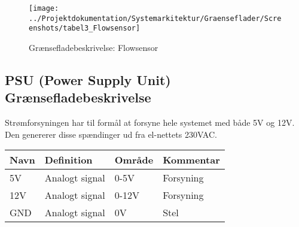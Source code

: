 \begin{figure}[H]
	\centering
	\texttt{[image: ../Projektdokumentation/Systemarkitektur/Graenseflader/Screenshots/tabel3\_Flowsensor]}
	\caption{Grænsefladebeskrivelse: Flowsensor}
	\label{screenshot:tabel3}
\end{figure}

\subsection{PSU (Power Supply Unit) Grænsefladebeskrivelse}
Strømforsyningen har til formål at forsyne hele systemet med både 5V og 12V. Den genererer disse spændinger ud fra el-nettets 230VAC.

\begin{table}[h]
\centering
\begin{tabular}{|l|l|l|l|}
\hline
\textbf{Navn} & \textbf{Definition} & \textbf{Område} & \textbf{Kommentar} \\ \hline
5V            & Analogt signal      & 0-5V            & Forsyning          \\ \hline
12V           & Analogt signal      & 0-12V           & Forsyning          \\ \hline
GND           & Analogt signal      & 0V              & Stel               \\ \hline
\end{tabular}
\end{table}